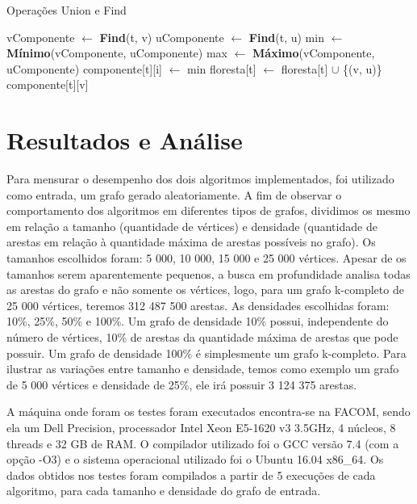 \documentclass[12pt]{article}
\begin{document}
\begin{algorithm}[h]
    \DontPrintSemicolon
    \caption{Operações Union e Find}
    \label{alg_par2}
    {
        vComponente $\gets$ \textbf{Find}(t, v)\;
        uComponente $\gets$ \textbf{Find}(t, u)\;
        min $\gets$ \textbf{Mínimo}(vComponente, uComponente)\;
		max $\gets$ \textbf{Máximo}(vComponente, uComponente)\;
        {
            {
                {
                    componente[t][i] $\gets$ min\;
                }
            }
            floresta[t] $\gets$ floresta[t] $\cup$ \{(v, u)\}\;
        }
    }
    {
        \Return componente[t][v]\;
    }
\end{algorithm}

\section{Resultados e Análise}

Para mensurar o desempenho dos dois algoritmos implementados, foi utilizado como entrada, um grafo gerado aleatoriamente. A fim de observar o comportamento dos algoritmos em diferentes tipos de grafos, dividimos os mesmo em relação a tamanho (quantidade de vértices) e densidade (quantidade de arestas em relação à quantidade máxima de arestas possíveis no grafo). Os tamanhos escolhidos foram: 5 000, 10 000, 15 000 e 25 000 vértices. Apesar de os tamanhos serem aparentemente pequenos, a busca em profundidade analisa todas as arestas do grafo e não somente os vértices, logo, para um grafo k-completo de 25 000 vértices, teremos 312 487 500 arestas. As densidades escolhidas foram: 10\%, 25\%, 50\% e 100\%. Um grafo de densidade 10\% possui, independente do número de vértices, 10\% de arestas da quantidade máxima de arestas que pode possuir. Um grafo de densidade 100\% é simplesmente um grafo k-completo. Para ilustrar as variações entre tamanho e densidade, temos como exemplo um grafo de 5 000 vértices e densidade de 25\%, ele irá possuir 3 124 375 arestas.

A máquina onde foram os testes foram executados encontra-se na FACOM, sendo ela um Dell Precision, processador Intel Xeon E5-1620 v3 3.5GHz, 4 núcleos, 8 threads e 32 GB de RAM. O compilador utilizado foi o GCC versão 7.4 (com a opção -O3) e o sistema operacional utilizado foi o Ubuntu 16.04 x86\_64. Os dados obtidos nos testes foram compilados a partir de 5 execuções de cada algoritmo, para cada tamanho e densidade do grafo de entrada.
\end{document}
